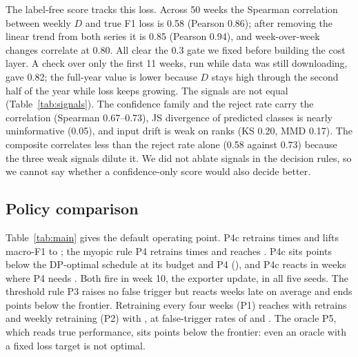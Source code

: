 \documentclass[conference]{IEEEtran}
\begin{document}
The label-free score tracks this loss. Across 50 weeks the Spearman correlation between weekly $D$ and true F1 loss is 0.58 (Pearson 0.86); after removing the linear trend from both series it is 0.85 (Pearson 0.94), and week-over-week changes correlate at 0.80. All clear the 0.3 gate we fixed before building the cost layer. A check over only the first 11 weeks, run while data was still downloading, gave 0.82; the full-year value is lower because $D$ stays high through the second half of the year while loss keeps growing. The signals are not equal (Table~\ref{tab:signals}). The confidence family and the reject rate carry the correlation (Spearman 0.67--0.73), JS divergence of predicted classes is nearly uninformative (0.05), and input drift is weak on ranks (KS 0.20, MMD 0.17). The composite correlates less than the reject rate alone (0.58 against 0.73) because the three weak signals dilute it. We did not ablate signals in the decision rules, so we cannot say whether a confidence-only score would also decide better.

\begin{table}[t]
\caption{Correlation of each oriented signal with true weekly macro-F1 loss of the never-retrained model (50 weeks).}
\label{tab:signals}
\centering\footnotesize

\end{table}

\subsection{Policy comparison}
Table~\ref{tab:main} gives the default operating point. P4c retrains \retrPfourc{} times and lifts macro-F1 to \fonePfourc{}; the myopic rule P4 retrains \retrPfour{} times and reaches \fonePfour{}. P4c sits \gapPfourc{} points below the DP-optimal schedule at its budget and P4 \gapPfour{} (\gapscope), and P4c reacts in \delayPfourc{} weeks where P4 needs \delayPfour{}. Both fire in week 10, the exporter update, in all five seeds. The threshold rule P3 raises no false trigger but reacts \delayPthree{} weeks late on average and ends \gapPthree{} points below the frontier. Retraining every four weeks (P1) reaches \fonePone{} with \retrPone{} retrains and weekly retraining (P2) \fonePtwo{} with \retrPtwo{}, at false-trigger rates of \ftPone{} and \ftPtwo{}. The oracle P5, which reads true performance, sits \gapPfive{} points below the frontier: even an oracle with a fixed loss target is not optimal.
\end{document}
